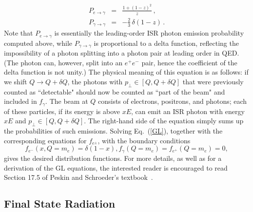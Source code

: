 \documentclass{ws-procs9x6}
\def\beq{\begin{equation}}
\def\eeq#1{\label{#1}\end{equation}}
\def\beqa{\begin{eqnarray}}
\def\eeqa#1{\label{#1}\end{eqnarray}}
\def\CR{\nonumber \\ }
\def\leqn#1{(\ref{#1})}
\begin{document}
\beqa
P_{e\to\gamma} &=& \frac{1+(1-z)^2}{z}\,,\CR
P_{\gamma\to\gamma} &=& -\frac{2}{3}\,\delta(1-z)\,.
\eeqa{Ps}
Note that $P_{e\to\gamma}$ is essentially the leading-order ISR photon emission probability computed above, while $P_{\gamma\to\gamma}$ is proportional to a delta function, reflecting the impossibility of a photon splitting into a photon pair at leading order in QED. (The photon can, however, split into an $e^+e^-$ pair, hence the coefficient of the delta function is not unity.) The physical meaning of this equation is as follows: if we shift $Q\to Q+\delta Q$, the photons with $p_\perp \in [Q, Q+\delta Q]$ that were previously counted as ``detectable" should now be counted as ``part  of the beam" and included in $f_\gamma$. The beam at $Q$ consists of electrons, positrons, and photons; each of these particles, if its energy is above $xE$, can emit an ISR photon with energy $xE$ and 
$p_\perp \in [Q, Q+\delta Q]$. The right-hand side of the equation simply sums up the probabilities of such emissions. Solving Eq.~\leqn{GL}, together with the corresponding equations for $f_{e^\pm}$, with the boundary conditions 
\beq
f_{e^-}(x,Q=m_e)=\delta(1-x), f_\gamma(Q=m_e)=f_{e^+}(Q=m_e)=0,
\eeq{BCs}
gives the desired distribution functions. For more details, as well as for a derivation of the GL equations, the interested reader is encouraged to read Section 17.5 of Peskin and Schroeder's textbook~\cite{PS}.

\subsection{Final State Radiation}
\label{sec:FSR}
\end{document}
